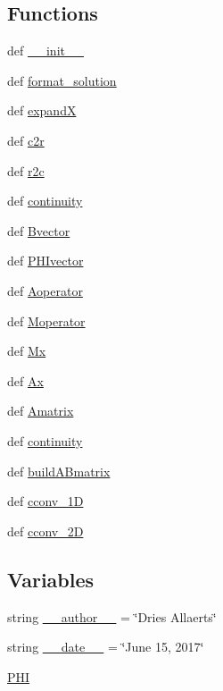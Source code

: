\subsection*{Functions}
\begin{DoxyCompactItemize}
\item 
def \hyperlink{namespacetlmpy_1_1TLM_ae75e2d198f207d795ffd60db3d926f0e}{\_\-\_\-init\_\-\_\-}
\item 
def \hyperlink{namespacetlmpy_1_1TLM_abdd135d6b78ddffa8145289a1a4f34d7}{format\_\-solution}
\item 
def \hyperlink{namespacetlmpy_1_1TLM_a37c4928c27b9fa2b93ef82e3a821d0d2}{expandX}
\item 
def \hyperlink{namespacetlmpy_1_1TLM_ae884a3fe664a15ec2887eb5774de5644}{c2r}
\item 
def \hyperlink{namespacetlmpy_1_1TLM_ad481b8522594a40d275088b12e94a4af}{r2c}
\item 
def \hyperlink{namespacetlmpy_1_1TLM_a49c209ea1c1d71e77068211c166097e4}{continuity}
\item 
def \hyperlink{namespacetlmpy_1_1TLM_ac14e3266c64ab5a1cca8c853aba8ec4a}{Bvector}
\item 
def \hyperlink{namespacetlmpy_1_1TLM_a557ba52a14aa64f4fae85e9bb8c707bd}{PHIvector}
\item 
def \hyperlink{namespacetlmpy_1_1TLM_a9fe851d277eca6ca4d22867b6c51b9a3}{Aoperator}
\item 
def \hyperlink{namespacetlmpy_1_1TLM_a40148bfa7778993b9c53585a057069a2}{Moperator}
\item 
def \hyperlink{namespacetlmpy_1_1TLM_a1c9a95ddc740eb1cfe8cd40789406031}{Mx}
\item 
def \hyperlink{namespacetlmpy_1_1TLM_a4cc641ba8986e09dd75d4a3ce6426438}{Ax}
\item 
def \hyperlink{namespacetlmpy_1_1TLM_a3a822c47ba30dc38ed9fafea4350292e}{Amatrix}
\item 
def \hyperlink{namespacetlmpy_1_1TLM_a49c209ea1c1d71e77068211c166097e4}{continuity}
\item 
def \hyperlink{namespacetlmpy_1_1TLM_a99b585016099ac73bccd67a53007b4e5}{buildABmatrix}
\item 
def \hyperlink{namespacetlmpy_1_1TLM_af212f19a8c1e7390e05d92f0ecfe4261}{cconv\_\-1D}
\item 
def \hyperlink{namespacetlmpy_1_1TLM_a9fcc8c8a811ceb37ec01274b0e207e1f}{cconv\_\-2D}
\end{DoxyCompactItemize}
\subsection*{Variables}
\begin{DoxyCompactItemize}
\item 
string \hyperlink{namespacetlmpy_1_1TLM_ab23e017eca5e365335146c0a949c96b4}{\_\-\_\-author\_\-\_\-} = \char`\"{}Dries Allaerts\char`\"{}
\item 
string \hyperlink{namespacetlmpy_1_1TLM_a8d29aed8107082d94640e02031d67613}{\_\-\_\-date\_\-\_\-} = \char`\"{}June 15, 2017\char`\"{}
\item 
\hyperlink{namespacetlmpy_1_1TLM_afc92ced32a0ad7707d14d146ec8eea02}{PHI}
\end{DoxyCompactItemize}


